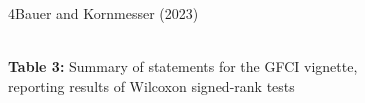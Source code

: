 \documentclass[xcolor=table,9pt,aspectratio=169]{beamer}
\begin{document}
\begin{frame}{\vspace*{10mm}4\hspace*{1em}Bauer and Kornmesser (2023)}
\vspace*{-5mm}
\begin{center}
   \\
   {\footnotesize\textbf{Table 3:} Summary of statements for the GFCI vignette,\\reporting results of Wilcoxon signed-rank tests}
\end{center}
\end{frame}
\end{document}
